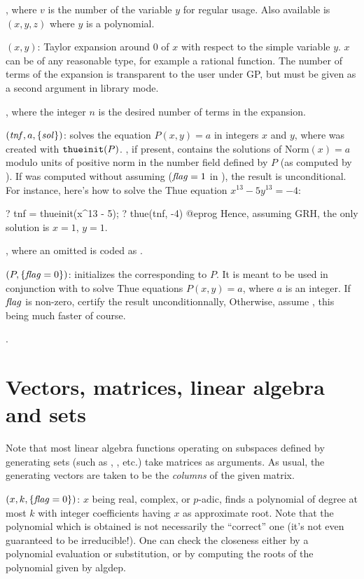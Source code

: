 , where $v$ is the number of the variable $y$ for regular
usage. Also available is $(x,y,z)$ where $y$ is a 
polynomial.

$(x,y)$: Taylor expansion around $0$ of $x$ with respect
to\label{se:taylor}
the simple variable $y$. $x$ can be of any reasonable type, for example a
rational function. The number of terms of the expansion is transparent to the
user under GP, but must be given as a second argument in library mode.

, where the  integer $n$ is the desired number of
terms in the expansion.

$(\hbox{\it tnf\/},a,\{\hbox{\it sol\/}\})$: solves the equation
$P(x,y)=a$ in integers $x$ and $y$, where  was created with
${\tt thueinit}(P)$. , if present, contains the solutions of
$\text{Norm}(x)=a$ modulo units of positive norm in the number field
defined by $P$ (as computed by ). If  was
computed without assuming  ($\hbox{\it f\kern0pt lag\/}=1$ in ), the
result is unconditional. For instance, here's how to solve the Thue
equation $x^{13} - 5y^{13} = - 4$:

\bprog
? tnf = thueinit(x^13 - 5);
? thue(tnf, -4)
@eprog
Hence, assuming GRH, the only solution is $x = 1$, $y = 1$.

, where an omitted  is coded
as .

$(P,\{\hbox{\it f\kern0pt lag\/}=0\})$: initializes the 
corresponding to $P$. It is meant to be used in conjunction with 
to solve Thue equations $P(x,y) = a$, where $a$ is an integer. If $\hbox{\it f\kern0pt lag\/}$ is
non-zero, certify the result unconditionnally, Otherwise, assume ,
this being much faster of course.

.

\section{Vectors, matrices, linear algebra and sets}
\label{se:linear_algebra}

Note that most linear algebra functions operating on subspaces defined by
generating sets (such as , , etc.) take matrices as
arguments. As usual, the generating vectors are taken to be the
\emph{columns} of the given matrix.

$(x,k,\{\hbox{\it f\kern0pt lag\/}=0\})$: $x$ being
real, complex, or $p$-adic, finds a polynomial of degree at most $k$ with
integer coefficients having $x$ as approximate root. Note that the polynomial
which is obtained is not necessarily the ``correct'' one (it's not even
guaranteed to be irreducible!). One can check the closeness either by a
polynomial evaluation or substitution, or by computing the roots of the
polynomial given by algdep.

